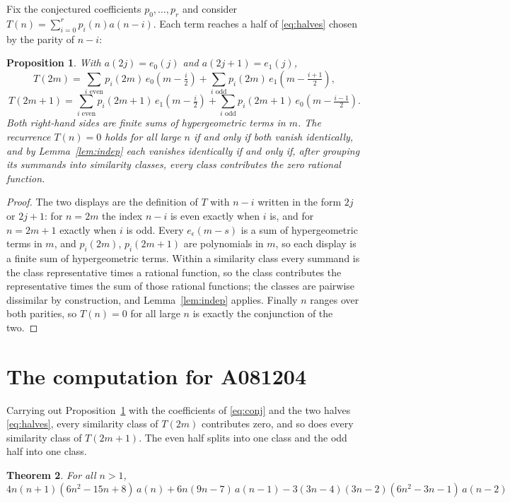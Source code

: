\documentclass[11pt,a4paper]{article}
\theoremstyle{plain}
\newtheorem{theorem}{Theorem}
\newtheorem{proposition}[theorem]{Proposition}
\theoremstyle{definition}
\begin{document}
Fix the conjectured coefficients $p_{0},\dots,p_{r}$ and consider
$T(n)=\sum_{i=0}^{r}p_{i}(n)a(n-i)$. Each term reaches a half of \eqref{eq:halves} chosen
by the parity of $n-i$:

\begin{proposition}\label{prop:split}
With $a(2j)=e_{0}(j)$ and $a(2j+1)=e_{1}(j)$,
\[
T(2m)=\sum_{i \text{ even}}p_{i}(2m)\,e_{0}\!\left(m-\tfrac{i}{2}\right)
      +\sum_{i \text{ odd}}p_{i}(2m)\,e_{1}\!\left(m-\tfrac{i+1}{2}\right),
\]
\[
T(2m+1)=\sum_{i \text{ even}}p_{i}(2m+1)\,e_{1}\!\left(m-\tfrac{i}{2}\right)
      +\sum_{i \text{ odd}}p_{i}(2m+1)\,e_{0}\!\left(m-\tfrac{i-1}{2}\right).
\]
Both right-hand sides are finite sums of hypergeometric terms in $m$. The recurrence
$T(n)=0$ holds for all large $n$ if and only if both vanish identically, and by
Lemma~\ref{lem:indep} each vanishes identically if and only if, after grouping its
summands into similarity classes, every class contributes the zero rational function.
\end{proposition}

\begin{proof}
The two displays are the definition of $T$ with $n-i$ written in the form $2j$ or $2j+1$:
for $n=2m$ the index $n-i$ is even exactly when $i$ is, and for $n=2m+1$ exactly when $i$
is odd. Every $e_{\epsilon}(m-s)$ is a sum of hypergeometric terms in $m$, and
$p_{i}(2m)$, $p_{i}(2m+1)$ are polynomials in $m$, so each display is a finite sum of
hypergeometric terms. Within a similarity class every summand is the class representative
times a rational function, so the class contributes the representative times the sum of
those rational functions; the classes are pairwise dissimilar by construction, and
Lemma~\ref{lem:indep} applies. Finally $n$ ranges over both parities, so $T(n)=0$ for all
large $n$ is exactly the conjunction of the two.
\end{proof}

\section{The computation for A081204}

Carrying out Proposition~\ref{prop:split} with the coefficients of \eqref{eq:conj} and the
two halves \eqref{eq:halves}, every similarity class of $T(2m)$ contributes zero, and so
does every similarity class of $T(2m+1)$. The even half splits into one class
and the odd half into one class.

\begin{theorem}
For all $n> 1$,
\[
4 n \left(n + 1\right) \left(6 n^{2} - 15 n + 8\right)\,a(n) + 6 n \left(9 n - 7\right)\,a(n-1) -  3 \left(3 n - 4\right) \left(3 n - 2\right) \left(6 n^{2} - 3 n - 1\right)\,a(n-2)
\]
\end{theorem}
\end{document}
